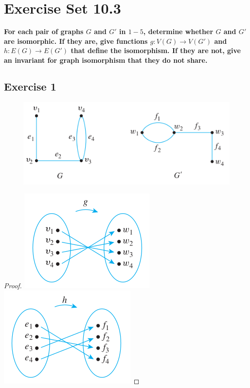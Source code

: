 \documentclass[14pt]{extarticle}
\newcommand{\cy}{\color{cyan}}
\begin{document}
\section{Exercise Set 10.3}
{\bf \cy For each pair of graphs \(G\) and \(G'\) in \(1-5\), determine whether \(G\) and \(G'\) are isomorphic. If they 
are, give functions \(g: V(G) \to V(G')\) and \(h: E(G) \to E(G')\) that define the isomorphism. If they are not, give an 
invariant for graph isomorphism that they do not share.}

\subsection{Exercise 1}
\begin{figure}[ht!]
\centering
\includegraphics[scale=0.5]{../images/10.3.1.png}
\end{figure}

\begin{proof}
\includegraphics[scale=0.5]{../images/10.3.1.a.png}
\includegraphics[scale=0.5]{../images/10.3.1.b.png}
\end{proof}
\end{document}
